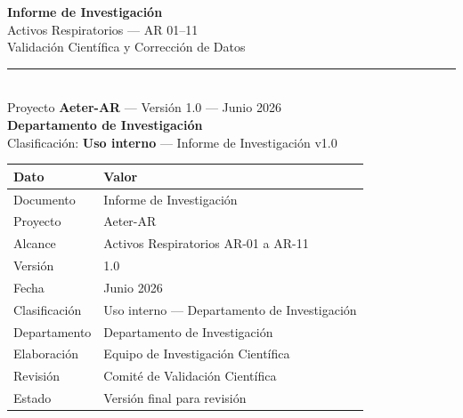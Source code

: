 \documentclass[12pt,a4paper]{article}
\begin{document}
\thispagestyle{empty}
\begin{center}
    {\LARGE \textbf{Informe de Investigación}}\\[0.2cm]
    {\Large Activos Respiratorios — AR 01–11}\\[0.15cm]
    {\Large \textcolor{azul}{Validación Científica y Corrección de Datos}}\\[0.3cm]
    \rule{0.7\textwidth}{0.4pt}\\[0.3cm]
    {\small Proyecto \textbf{Aeter-AR} — Versión 1.0 — Junio 2026}\\[0.1cm]
    {\small \textbf{Departamento de Investigación}}\\[0.1cm]
    {\small Clasificación: \textbf{Uso interno} — Informe de Investigación v1.0}
\end{center}

\vspace{0.8cm}

\begin{center}
\begin{tabularx}{0.8\textwidth}{lX}
    \toprule
    \textbf{Dato} & \textbf{Valor} \\
    \midrule
    Documento & Informe de Investigación \\
    Proyecto & Aeter-AR \\
    Alcance & Activos Respiratorios AR-01 a AR-11 \\
    Versión & 1.0 \\
    Fecha & Junio 2026 \\
    Clasificación & Uso interno — Departamento de Investigación \\
    Departamento & Departamento de Investigación \\
    Elaboración & Equipo de Investigación Científica \\
    Revisión & Comité de Validación Científica \\
    Estado & Versión final para revisión \\
    \bottomrule
\end{tabularx}
\end{center}

\vspace{0.5cm}

\begin{center}
\end{center}
\end{document}
